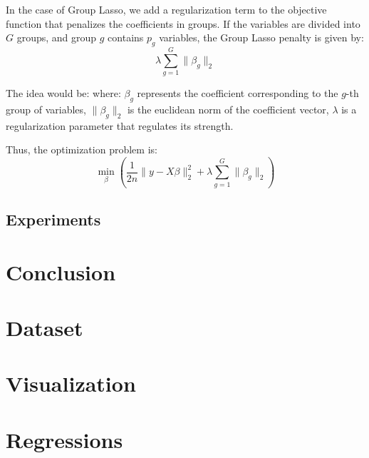 \documentclass[a4paper, 8pt]{article}
\begin{document}
\begin{multicols}{2}
In the case of Group Lasso, we add a regularization term to the objective function that penalizes the coefficients in groups. If the variables are divided into $G$ groups, and group $g$ contains $p_{g}$ variables, the Group Lasso penalty is given by:
\begin{equation}
\lambda \sum_{g=1}^{G}\lVert \beta_{g} \rVert_{2}
\end{equation}

The idea would be: where: $\beta_g$ represents the coefficient corresponding to the $g$-th group of variables, $\lVert \beta_g \rVert_2$ is the euclidean norm of the coefficient vector, $\lambda$ is a regularization parameter that regulates its strength.

Thus, the optimization problem is:
\begin{equation}
\min_{\beta}\left (\frac{1}{2n}\lVert y-X\beta\rVert^{2}_{2} + \lambda \sum_{g=1}^{G}\lVert \beta_{g} \rVert_{2}\right)
\end{equation}

\subsection{Experiments}


\section{Conclusion}
\noindent

\end{multicols}


\pagebreak
\appendix

\section{Dataset}



\section{Visualization}

\section{Regressions}
\end{document}

